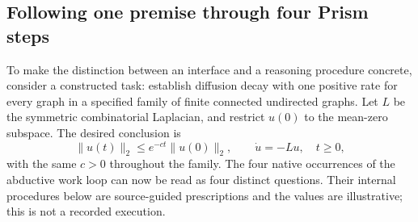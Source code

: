 \subsection{Following one premise through four Prism steps}
\label{sec:step-walkthrough}
To make the distinction between an interface and a reasoning procedure concrete,
consider a constructed task: establish diffusion decay with one positive rate for
every graph in a specified family of finite connected undirected graphs. Let $L$
be the symmetric combinatorial Laplacian, and restrict $u(0)$ to the mean-zero
subspace. The desired conclusion is
\[
 \|u(t)\|_2\leq e^{-ct}\|u(0)\|_2,
 \qquad \dot u=-Lu,\quad t\geq0,
\]
with the same $c>0$ throughout the family. The four native occurrences of the
abductive work loop can now be read as four distinct questions. Their internal
procedures below are source-guided prescriptions and the values are illustrative;
this is not a recorded execution.

